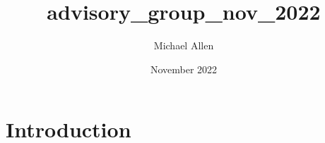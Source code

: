 \documentclass{article}
\title{advisory_group_nov_2022}
\author{Michael Allen}
\date{November 2022}
\begin{document}
\maketitle

\section{Introduction}
\end{document}
